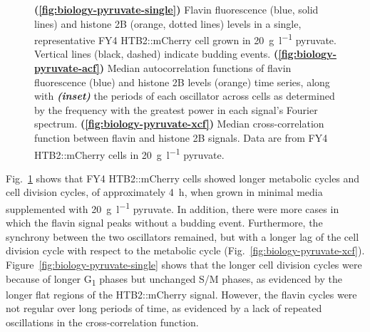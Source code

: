 \begin{figure}
  \caption{
    \textbf{(\ref{fig:biology-pyruvate-single})}
    Flavin fluorescence (blue, solid lines) and histone 2B (orange, dotted lines) levels in a single, representative FY4 HTB2::mCherry cell grown in \SI{20}{\gram~\litre^{-1}} pyruvate.
    Vertical lines (black, dashed) indicate budding events.
    \textbf{(\ref{fig:biology-pyruvate-acf})}
    Median autocorrelation functions of flavin fluorescence (blue) and histone 2B levels (orange) time series, along with \textit{\textbf{(inset)}} the periods of each oscillator across cells as determined by the frequency with the greatest power in each signal's Fourier spectrum.
    \textbf{(\ref{fig:biology-pyruvate-xcf})}
    Median cross-correlation function between flavin and histone 2B signals.
    Data are from FY4 HTB2::mCherry cells in \SI{20}{\gram~\litre^{-1}} pyruvate.
  }
  \label{fig:biology-pyruvate}
\end{figure}

Fig.\ \ref{fig:biology-pyruvate} shows that FY4 HTB2::mCherry cells showed longer metabolic cycles and cell division cycles, of approximately \SI{4}{\hour}, when grown in minimal media supplemented with \SI{20}{\gram~\litre^{-1}} pyruvate.
In addition, there were more cases in which the flavin signal peaks without a budding event. %
Furthermore, the synchrony between the two oscillators remained, but with a longer lag of the cell division cycle with respect to the metabolic cycle (Fig.\ \ref{fig:biology-pyruvate-xcf}).
Figure~\ref{fig:biology-pyruvate-single} shows that the longer cell division cycles were because of longer G\textsubscript{1} phases but unchanged S/M phases, as evidenced by the longer flat regions of the HTB2::mCherry signal.
However, the flavin cycles were not regular over long periods of time, as evidenced by a lack of repeated oscillations in the cross-correlation function.



